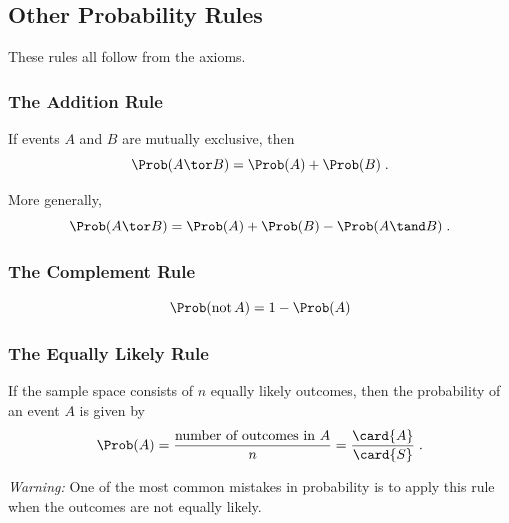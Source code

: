 \documentclass[twoside]{book}\usepackage[]{graphicx}\usepackage[]{xcolor}
\def\tnot{\operatorname{not}}
\begin{document}
\subsection{Other Probability Rules}
These rules all follow from the axioms.
\subsubsection*{The Addition Rule}

If events $A$  and $B$ are mutually exclusive, then 
\[
\Prob(A \tor B) = \Prob(A) + \Prob(B)
\; .
\]

More generally,
\[
\Prob(A \tor B) = \Prob(A) + \Prob(B) - \Prob(A \tand B)
\; .
\]


\subsubsection*{The Complement Rule}

\[
\Prob(\tnot A) = 1 - \Prob(A)
\]


\subsubsection*{The Equally Likely Rule}

If the sample space consists of $n$ equally likely outcomes, then
the probability of an event $A$ is given by
\[
\Prob(A) = \frac{ \mbox{number of outcomes in $A$}}{n}
=\frac{ \card{A} }{\card{S} }\; .
\]

\emph{Warning:} One of the most common mistakes in probability is to apply this rule
when the outcomes are not equally likely.
\end{document}
